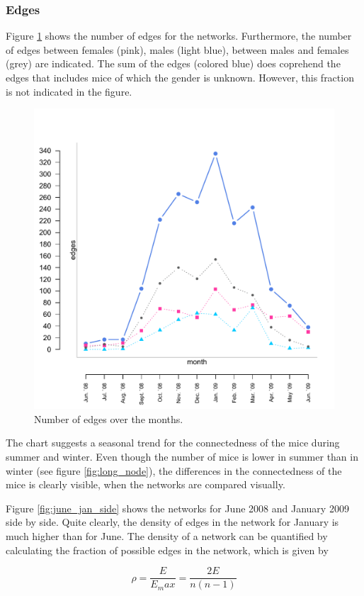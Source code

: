 \subsubsection{Edges}

Figure \ref{fig:long_edges} shows the number of edges for the networks. Furthermore, the number of edges between females (pink), males (light blue), between males and females (grey) are indicated. The sum of the edges (colored blue) does coprehend the edges that includes mice of which the gender is unknown. However, this fraction is not indicated in the figure.

\begin{figure}[htpb]
\begin{center}
  \includegraphics[width=.6\textwidth]{assets/pdf/long_edges.pdf}
  \caption[Number of edges over the months]{Number of edges over the months.}
  \label{fig:long_edges}
\end{center}
\end{figure}

The chart suggests a seasonal trend for the connectedness of the mice during summer and winter. Even though the number of mice is lower in summer than in winter (see figure \ref{fig:long_node}), the differences in the connectedness of the mice is clearly visible, when the networks are compared visually. 

Figure \ref{fig:june_jan_side} shows the networks for June 2008 and January 2009 side by side. Quite clearly, the density of edges in the network for January is much higher than for June. The density of a network can be quantified by calculating the fraction of possible edges in the network, which is given by 

\begin{equation}
\rho = \frac{E}{E_max} = \frac{2E}{n(n-1)}
\label{eq:density}
\end{equation}      

